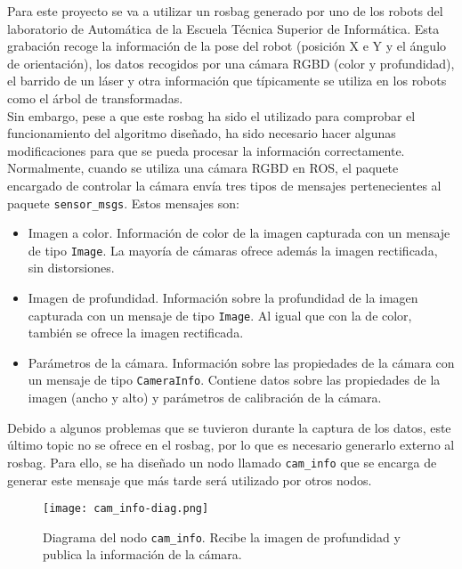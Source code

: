 Para este proyecto se va a utilizar un rosbag generado por uno de los robots del laboratorio de Automática de la Escuela Técnica Superior de Informática. Esta grabación recoge la información de la pose del robot (posición X e Y y el ángulo de orientación), los datos recogidos por una cámara RGBD (color y profundidad), el barrido de un láser y otra información que típicamente se utiliza en los robots como el árbol de transformadas.\\

Sin embargo, pese a que este rosbag ha sido el utilizado para comprobar el funcionamiento del algoritmo diseñado, ha sido necesario hacer algunas modificaciones para que se pueda procesar la información correctamente.\\

Normalmente, cuando se utiliza una cámara RGBD en ROS, el paquete encargado de controlar la cámara envía tres tipos de mensajes pertenecientes al paquete \texttt{sensor\_msgs}. Estos mensajes son:

\begin{itemize}

	\item Imagen a color. Información de color de la imagen capturada con un mensaje de tipo \texttt{Image}. La mayoría de cámaras ofrece además la imagen rectificada, sin distorsiones.
	\item Imagen de profundidad. Información sobre la profundidad de la imagen capturada con un mensaje de tipo \texttt{Image}. Al igual que con la de color, también se ofrece la imagen rectificada.
	\item Parámetros de la cámara. Información sobre las propiedades de la cámara con un mensaje de tipo \texttt{CameraInfo}. Contiene datos sobre las propiedades de la imagen (ancho y alto) y parámetros de calibración de la cámara.

\end{itemize}

Debido a algunos problemas que se tuvieron durante la captura de los datos, este último topic no se ofrece en el rosbag, por lo que es necesario generarlo externo al rosbag. Para ello, se ha diseñado un nodo llamado \texttt{cam\_info} que se encarga de generar este mensaje que más tarde será utilizado por otros nodos.\\

\begin{figure}[h]
	\begin{center} 
		\texttt{[image: cam\_info-diag.png]}
	\end{center}
	\caption{Diagrama del nodo \texttt{cam\_info}. Recibe la imagen de profundidad y publica la información de la cámara.}
	\label{fig:cam_info}
\end{figure}


